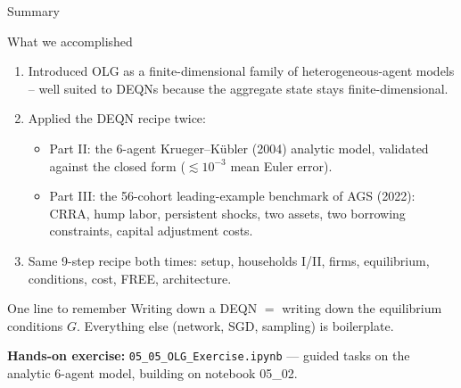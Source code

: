 \documentclass[aspectratio=169,11pt]{beamer}
\newcommand{\emphc}[1]{\textcolor{harvardcrimson}{#1}}
\begin{document}
\begin{frame}[shrink=8]{Summary}
\footnotesize
\begin{block}{What we accomplished}
\vspace{-2pt}\begin{enumerate}\itemsep1pt
    \item Introduced OLG as a finite-dimensional family of heterogeneous-agent models -- well suited to DEQNs because the aggregate state stays finite-dimensional.
    \item Applied the DEQN recipe \emphc{twice}:
    \begin{itemize}\itemsep0pt
        \item \emphc{Part II:} the 6-agent Krueger--K\"ubler (2004) analytic model, validated against the closed form ($\lesssim 10^{-3}$ mean Euler error).
        \item \emphc{Part III:} the 56-cohort leading-example benchmark of AGS (2022): CRRA, hump labor, persistent shocks, two assets, two borrowing constraints, capital adjustment costs.
    \end{itemize}
    \item \emphc{Same 9-step recipe} both times: setup, households I/II, firms, equilibrium, conditions, cost, FREE, architecture.
\end{enumerate}
\end{block}

\vspace{-2pt}
\begin{alertblock}{One line to remember}
\emphc{Writing down a DEQN $=$ writing down the equilibrium conditions $G$.}  Everything else (network, SGD, sampling) is boilerplate.
\end{alertblock}

\vspace{0.2em}
{\footnotesize \textbf{Hands-on exercise:} \texttt{05\_05\_OLG\_Exercise.ipynb} --- guided tasks on the analytic 6-agent model, building on notebook 05\_02.}
\end{frame}
\end{document}
